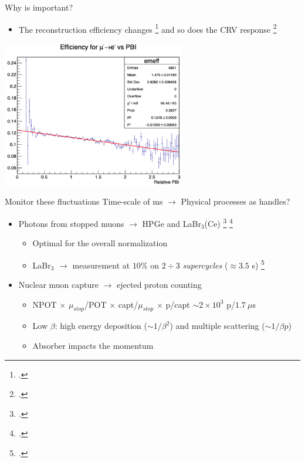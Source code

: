 \documentclass[10pt]{beamer}
\begin{document}
\begin{frame}{Why is important?}
\begin{itemize}
\item The reconstruction efficiency changes \footcite{MDC2018:PBI} and so does the CRV response \footcite{MDC2018}
\end{itemize}
\begin{center}
\includegraphics[width=0.6\textwidth]{Dave_eff-vs-PBI}
\end{center}
\end{frame}

%
\begin{frame}{Monitor these fluctuations}
Time-scale of ms $\rightarrow$ Physical processes as handles?
\vspace{0.3cm}
\begin{itemize}
\setlength\itemsep{0.5cm}
\item Photons from stopped muons $\rightarrow$ HPGe and LaBr$_3$(Ce) \footcite{STM:2016} \footcite{LaBr3:2020}\\
\begin{itemize}
\setlength\itemsep{0.2cm}
\item Optimal for the overall normalization\\
\item LaBr$_3$ $\rightarrow$ measurement at $10\%$ on $2\div3$ \textit{supercycles} ($\approx 3.5$ s) \footcite{LaBr3:2019}
\end{itemize}
\item Nuclear muon capture $\rightarrow$ ejected proton counting
\begin{itemize}
\setlength\itemsep{0.2cm}
\item NPOT $\times$ $\mu_{stop}$/POT $\times$ capt/$\mu_{stop}$ $\times$ p/capt $\sim 2\times10^3$ p/$1.7\ \mu$s\\
\item Low $\beta$: high energy deposition ($\sim 1/\beta^2$) and multiple scattering ($\sim 1/\beta p$)
\item Absorber impacts the momentum
\end{itemize}
\end{itemize}
\end{frame}
\end{document}
